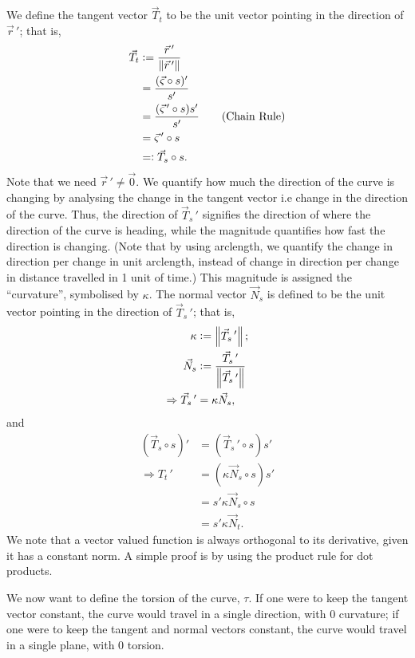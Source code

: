 \documentclass{article}
\newcommand{\vc}{\vcentcolon}
\theoremstyle{definition}
\begin{document}
We define the tangent vector $\vec T_t$ to be the unit vector pointing in the direction of $\vec r\,'$; that is,
\begin{align*}
	\vec T_t&\vc=\frac{\vec r\,'}{\left\lVert\vec r\,'\right\rVert}\\
	&=\frac{(\vec\varsigma\circ s)'}{s'}\\
	&=\frac{(\vec\varsigma\,'\circ s)s'}{s'}\tag*{(Chain Rule)}\\
	&=\vec\varsigma\,'\circ s\\
	&=\vc\vec T_s\circ s.
\end{align*}
Note that we need $\vec r\,'\not=\vec0$.
We quantify how much the direction of the curve is changing by analysing the change in the tangent vector i.e change in the direction of the curve. Thus, the direction of $\vec T_s\,'$ signifies the direction of where the direction of the curve is heading, while the magnitude quantifies how fast the direction is changing. (Note that by using arclength, we quantify the change in direction per change in unit arclength, instead of change in direction per change in distance travelled in 1 unit of time.) This magnitude is assigned the ``curvature'', symbolised by $\kappa$. The normal vector $\vec N_s$ is defined to be the unit vector pointing in the direction of $\vec T_s\,'$; that is,
\begin{align*}
	\kappa&\vc=\left\lVert\vec T_s\,'\right\rVert;\\
	\vec N_s&\vc=\frac{\vec T_s\,'}{\left\lVert\vec T_s\,'\right\rVert}\\
	\Rightarrow\vec T_s\,'&=\kappa \vec N_s,
\end{align*}
and
\begin{align*}
	(\vec T_s\circ s)'&=(\vec T_s\,'\circ s)s'\\
	\Rightarrow T_t\,'&=(\kappa \vec N_s\circ s)s'\\
	&=s'\kappa \vec N_s\circ s\\
	&=s'\kappa \vec N_t.
\end{align*}
We note that a vector valued function is always orthogonal to its derivative, given it has a constant norm. A simple proof is by using the product rule for dot products.\par

We now want to define the torsion of the curve, $\tau$. If one were to keep the tangent vector constant, the curve would travel in a single direction, with 0 curvature; if one were to keep the tangent and normal vectors constant, the curve would travel in a single plane, with 0 torsion.\par
\end{document}
